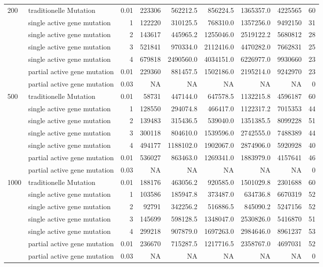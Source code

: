 \begin{table}[!ht]
{\begin{tabular}{ |l|l|r||r|r|r|r|r|r|}
  \multirow{ 7 }{*}{200}  
   & traditionelle Mutation & 0.01 & 223306 & 562212.5 & 856224.5 & 1365357.0 & 4225565 & 60 \\
   & single active gene mutation & 1 & 122220 & 310125.5 & 768310.0 & 1357256.0 & 9492150 & 31 \\ 
   & single active gene mutation & 2 & 143617 & 445965.2 & 1255046.0 & 2519122.2 & 5680812 & 28 \\
   & single active gene mutation & 3 & 521841 & 970334.0 & 2112416.0 & 4470282.0 & 7662831 & 25 \\
   & single active gene mutation & 4 & 679818 & 2490560.0 & 4034151.0 & 6226977.0 & 9930660 & 23 \\
   & partial active gene mutation & 0.01 & 229360 & 881457.5 & 1502186.0 & 2195214.0 & 9242970 & 23 \\
   & partial active gene mutation & 0.03 & NA & NA & NA & NA & NA & 0 \\
      \hline
   
  \multirow{ 7 }{*}{500}  
   & traditionelle Mutation & 0.01 & 58731 & 447144.0 & 647578.5 & 1132215.8 & 4596187 & 60 \\
   & single active gene mutation & 1 & 128550 & 294074.8 & 466417.0 & 1122317.2 & 7015353 & 44 \\ 
   & single active gene mutation & 2 & 139483 & 315436.5 & 539040.0 & 1351385.5 & 8099228 & 51 \\
   & single active gene mutation & 3 & 300118 & 804610.0 & 1539596.0 & 2742555.0 & 7488389 & 44 \\
   & single active gene mutation & 4 & 494177 & 1188102.0 & 1902067.0 & 2874906.0 & 5920928 & 40 \\
   & partial active gene mutation & 0.01 & 536027 & 863463.0 & 1269341.0 & 1883979.0 & 4157641 & 46 \\
   & partial active gene mutation & 0.03 & NA & NA & NA & NA & NA & 0 \\
      \hline
   
  \multirow{ 7 }{*}{1000}  
   & traditionelle Mutation & 0.01 & 188176 & 463056.2 & 920585.0 & 1501029.8 & 2301688 & 60 \\
   & single active gene mutation & 1 & 103586 & 185947.8 & 373487.0 & 634736.8 & 6670319 & 52 \\ 
   & single active gene mutation & 2 & 92791 & 342256.2 & 516886.5 & 845090.2 & 5247156 & 52 \\
   & single active gene mutation & 3 & 145699 & 598128.5 & 1348047.0 & 2530826.0 & 5416870 & 51 \\
   & single active gene mutation & 4 & 299218 & 907879.0 & 1697263.0 & 2984646.0 & 8961237 & 53 \\
   & partial active gene mutation & 0.01 & 236670 & 715287.5 & 1217716.5 & 2358767.0 & 4697031 & 52 \\
   & partial active gene mutation & 0.03 & NA & NA & NA & NA & NA & 0 \\
      \hline
\end{tabular}
}
\label{table_meta3}
\end{table}

